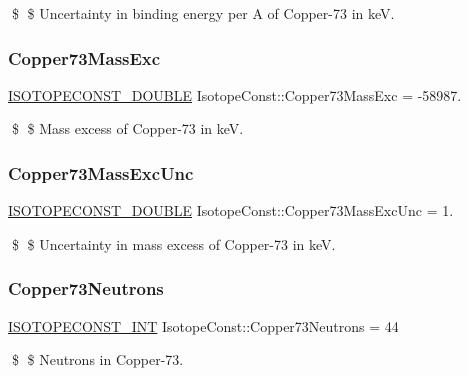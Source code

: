 \$ \$ Uncertainty in binding energy per A of Copper-\/73 in keV. \mbox{\label{group___isotope_const-_copper-_cu73_ga3803435a762c0d1f77d38e93e1871bfe}} 
\subsubsection{\texorpdfstring{Copper73\+Mass\+Exc}{Copper73MassExc}}
{\footnotesize\ttfamily \mbox{\hyperlink{group___isotope_const-_macros_ga8f45a7272ce02c0b4c65c44636ed719a}{I\+S\+O\+T\+O\+P\+E\+C\+O\+N\+S\+T\+\_\+\+D\+O\+U\+B\+LE}} Isotope\+Const\+::\+Copper73\+Mass\+Exc = -\/58987.}

\$ \$ Mass excess of Copper-\/73 in keV. \mbox{\label{group___isotope_const-_copper-_cu73_ga97712e2bf297683460fda67871167f2c}} 
\subsubsection{\texorpdfstring{Copper73\+Mass\+Exc\+Unc}{Copper73MassExcUnc}}
{\footnotesize\ttfamily \mbox{\hyperlink{group___isotope_const-_macros_ga8f45a7272ce02c0b4c65c44636ed719a}{I\+S\+O\+T\+O\+P\+E\+C\+O\+N\+S\+T\+\_\+\+D\+O\+U\+B\+LE}} Isotope\+Const\+::\+Copper73\+Mass\+Exc\+Unc = 1.}

\$ \$ Uncertainty in mass excess of Copper-\/73 in keV. \mbox{\label{group___isotope_const-_copper-_cu73_gad438db828beb4c6b0fef0e0be5ec3712}} 
\subsubsection{\texorpdfstring{Copper73\+Neutrons}{Copper73Neutrons}}
{\footnotesize\ttfamily \mbox{\hyperlink{group___isotope_const-_macros_ga5f18360b3e99483a35c32d789e62621c}{I\+S\+O\+T\+O\+P\+E\+C\+O\+N\+S\+T\+\_\+\+I\+NT}} Isotope\+Const\+::\+Copper73\+Neutrons = 44}

\$ \$ Neutrons in Copper-\/73. \mbox{\label{group___isotope_const-_copper-_cu73_ga5b4e16751b39bbf8f827a021c20abe37}} 
